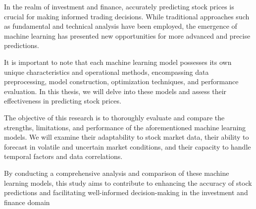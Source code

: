 \documentclass{ieeeojies}
\begin{document}
In the realm of investment and finance, accurately predicting stock prices is crucial for making informed trading decisions. While traditional approaches such as fundamental and technical analysis have been employed, the emergence of machine learning has presented new opportunities for more advanced and precise predictions.

It is important to note that each machine learning model possesses its own unique characteristics and operational methods, encompassing data preprocessing, model construction, optimization techniques, and performance evaluation. In this thesis, we will delve into these models and assess their effectiveness in predicting stock prices.

The objective of this research is to thoroughly evaluate and compare the strengths, limitations, and performance of the aforementioned machine learning models. We will examine their adaptability to stock market data, their ability to forecast in volatile and uncertain market conditions, and their capacity to handle temporal factors and data correlations.

By conducting a comprehensive analysis and comparison of these machine learning models, this study aims to contribute to enhancing the accuracy of stock predictions and facilitating well-informed decision-making in the investment and finance domain
\end{document}
